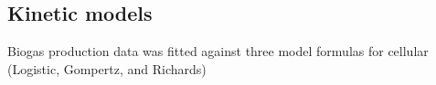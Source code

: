 \subsection{Kinetic models}
Biogas production data was fitted against three model formulas for cellular  (Logistic, Gompertz, and Richards)